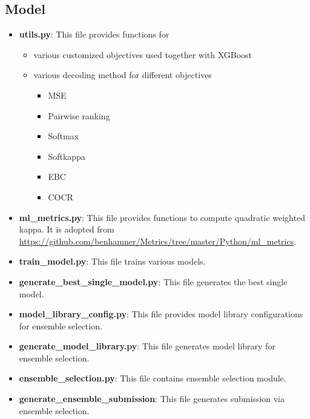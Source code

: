 \documentclass[12pt]{article}
\begin{document}
\subsection{Model}
\begin{itemize}
\item \textbf{utils.py}: This file provides functions for
        \begin{itemize}
        \item various customized objectives used together with XGBoost
        \item various decoding method for different objectives
            \begin{itemize}
            \item MSE
            \item Pairwise ranking
            \item Softmax
            \item Softkappa
            \item EBC
            \item COCR
            \end{itemize}
        \end{itemize}
\item \textbf{ml\_metrics.py}: This file provides functions to compute quadratic weighted kappa. It is adopted from \url{https://github.com/benhamner/Metrics/tree/master/Python/ml_metrics}.
\item \textbf{train\_model.py}: This file trains various models.
\item \textbf{generate\_best\_single\_model.py}: This file generates the best single model.
\item \textbf{model\_library\_config.py}: This file provides model library configurations for ensemble selection.
\item \textbf{generate\_model\_library.py}: This file generates model library for ensemble selection.
\item \textbf{ensemble\_selection.py}: This file contains ensemble selection module.
\item \textbf{generate\_ensemble\_submission}: This file generates submission via ensemble selection.
\end{itemize}
\end{document}
